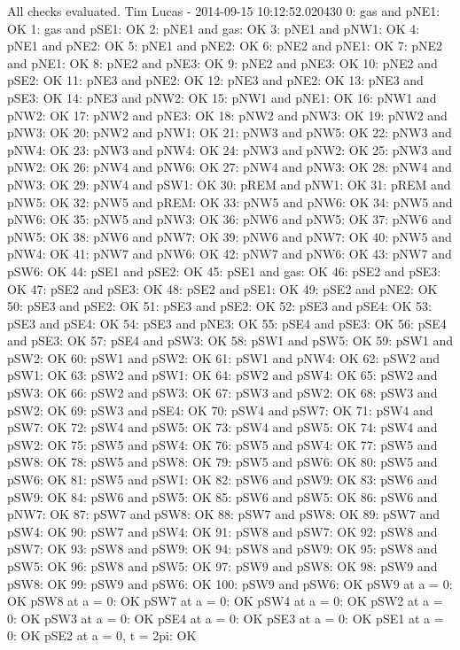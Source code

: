 All checks evaluated.
Tim Lucas - 2014-09-15 10:12:52.020430
0: gas and pNE1: OK
1: gas and pSE1: OK
2: pNE1 and gas: OK
3: pNE1 and pNW1: OK
4: pNE1 and pNE2: OK
5: pNE1 and pNE2: OK
6: pNE2 and pNE1: OK
7: pNE2 and pNE1: OK
8: pNE2 and pNE3: OK
9: pNE2 and pNE3: OK
10: pNE2 and pSE2: OK
11: pNE3 and pNE2: OK
12: pNE3 and pNE2: OK
13: pNE3 and pSE3: OK
14: pNE3 and pNW2: OK
15: pNW1 and pNE1: OK
16: pNW1 and pNW2: OK
17: pNW2 and pNE3: OK
18: pNW2 and pNW3: OK
19: pNW2 and pNW3: OK
20: pNW2 and pNW1: OK
21: pNW3 and pNW5: OK
22: pNW3 and pNW4: OK
23: pNW3 and pNW4: OK
24: pNW3 and pNW2: OK
25: pNW3 and pNW2: OK
26: pNW4 and pNW6: OK
27: pNW4 and pNW3: OK
28: pNW4 and pNW3: OK
29: pNW4 and pSW1: OK
30: pREM and pNW1: OK
31: pREM and pNW5: OK
32: pNW5 and pREM: OK
33: pNW5 and pNW6: OK
34: pNW5 and pNW6: OK
35: pNW5 and pNW3: OK
36: pNW6 and pNW5: OK
37: pNW6 and pNW5: OK
38: pNW6 and pNW7: OK
39: pNW6 and pNW7: OK
40: pNW5 and pNW4: OK
41: pNW7 and pNW6: OK
42: pNW7 and pNW6: OK
43: pNW7 and pSW6: OK
44: pSE1 and pSE2: OK
45: pSE1 and gas: OK
46: pSE2 and pSE3: OK
47: pSE2 and pSE3: OK
48: pSE2 and pSE1: OK
49: pSE2 and pNE2: OK
50: pSE3 and pSE2: OK
51: pSE3 and pSE2: OK
52: pSE3 and pSE4: OK
53: pSE3 and pSE4: OK
54: pSE3 and pNE3: OK
55: pSE4 and pSE3: OK
56: pSE4 and pSE3: OK
57: pSE4 and pSW3: OK
58: pSW1 and pSW5: OK
59: pSW1 and pSW2: OK
60: pSW1 and pSW2: OK
61: pSW1 and pNW4: OK
62: pSW2 and pSW1: OK
63: pSW2 and pSW1: OK
64: pSW2 and pSW4: OK
65: pSW2 and pSW3: OK
66: pSW2 and pSW3: OK
67: pSW3 and pSW2: OK
68: pSW3 and pSW2: OK
69: pSW3 and pSE4: OK
70: pSW4 and pSW7: OK
71: pSW4 and pSW7: OK
72: pSW4 and pSW5: OK
73: pSW4 and pSW5: OK
74: pSW4 and pSW2: OK
75: pSW5 and pSW4: OK
76: pSW5 and pSW4: OK
77: pSW5 and pSW8: OK
78: pSW5 and pSW8: OK
79: pSW5 and pSW6: OK
80: pSW5 and pSW6: OK
81: pSW5 and pSW1: OK
82: pSW6 and pSW9: OK
83: pSW6 and pSW9: OK
84: pSW6 and pSW5: OK
85: pSW6 and pSW5: OK
86: pSW6 and pNW7: OK
87: pSW7 and pSW8: OK
88: pSW7 and pSW8: OK
89: pSW7 and pSW4: OK
90: pSW7 and pSW4: OK
91: pSW8 and pSW7: OK
92: pSW8 and pSW7: OK
93: pSW8 and pSW9: OK
94: pSW8 and pSW9: OK
95: pSW8 and pSW5: OK
96: pSW8 and pSW5: OK
97: pSW9 and pSW8: OK
98: pSW9 and pSW8: OK
99: pSW9 and pSW6: OK
100: pSW9 and pSW6: OK
pSW9 at a = 0: OK
pSW8 at a = 0: OK
pSW7 at a = 0: OK
pSW4 at a = 0: OK
pSW2 at a = 0: OK
pSW3 at a = 0: OK
pSE4 at a = 0: OK
pSE3 at a = 0: OK
pSE1 at a = 0: OK
pSE2 at a = 0, t = 2pi: OK
